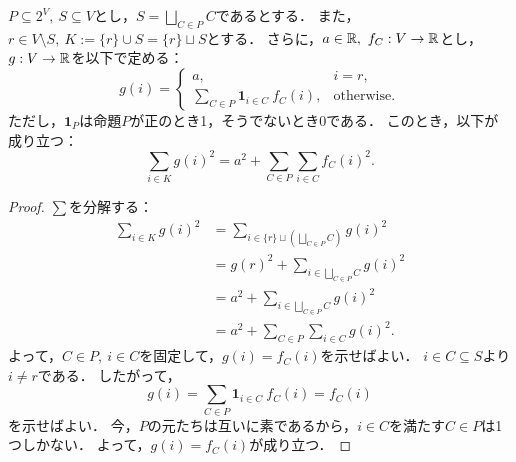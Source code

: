 \begin{lemma}
  \label{lem:combined_sq_sum}
  \leanok
  \uses{}
  $P \subseteq 2 ^ V,\ S \subseteq V$とし，$S = \displaystyle \bigsqcup_{C \in P} C$であるとする．
  また，$r \in V \setminus S,\ K := \{r\} \cup S = \{r\} \sqcup S$とする．
  さらに，$a \in \mathbb{R},\ f_C : V \rightarrow \mathbb{R}$とし，$g : V \rightarrow \mathbb{R}$を以下で定める：
  \begin{equation}
    g(i) = \begin{cases}
      a, & i = r,\\
      \displaystyle \sum_{C \in P} \bm{1}_{i \in C}\ f_C(i), & \text{otherwise}.
    \end{cases}
  \end{equation}
  ただし，$\bm{1}_{P}$は命題$P$が正のとき1，そうでないとき0である．
  このとき，以下が成り立つ：
  \begin{equation}
    \sum_{i \in K} g(i) ^ 2
    = a ^ 2 + \sum_{C \in P} \sum_{i \in C} f_C(i) ^ 2.
  \end{equation}
\end{lemma}

\begin{proof}
  $\sum$を分解する：
  \begin{align}
    \sum_{i \in K} g(i) ^ 2
    &= \sum_{i \in \{r\} \sqcup \left( \bigsqcup_{C \in P} C \right)} g(i) ^ 2 \\
    &= g(r) ^ 2 + \sum_{i \in \bigsqcup_{C \in P} C} g(i) ^ 2 \\
    &= a ^ 2 + \sum_{i \in \bigsqcup_{C \in P} C} g(i) ^ 2 \\
    &= a ^ 2 + \sum_{C \in P} \sum_{i \in C} g(i) ^ 2.
  \end{align}
  よって，$C \in P,\ i \in C$を固定して，$g(i) = f_C(i)$を示せばよい．
  $i \in C \subseteq S$より$i \ne r$である．
  したがって，
  \begin{equation}
    g(i)
    = \displaystyle \sum_{C \in P} \bm{1}_{i \in C}\ f_C(i)
    = f_C(i)
  \end{equation}
  を示せばよい．
  今，$P$の元たちは互いに素であるから，$i \in C$を満たす$C \in P$は1つしかない．
  よって，$g(i) = f_C(i)$が成り立つ．
\end{proof}

